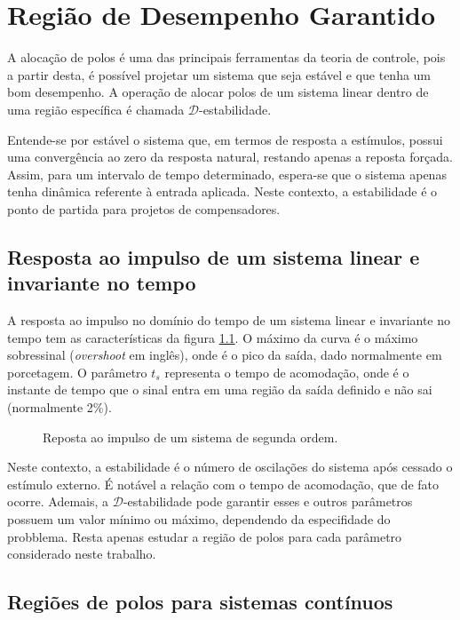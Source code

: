 \chapter{Região de Desempenho Garantido}

A alocação de polos é uma das principais ferramentas da teoria de controle, pois a partir desta, é possível projetar um sistema que seja estável e que tenha um bom desempenho\cite{ROSINOVA2014}. A operação de alocar polos de um sistema linear dentro de uma região específica é chamada $\mathscr{D}$-estabilidade\cite{CHILALI1996}.

Entende-se por estável o sistema que, em termos de resposta a estímulos, possui uma convergência ao zero da resposta natural, restando apenas a reposta forçada\cite{NISE2011}. Assim, para um intervalo de tempo determinado, espera-se que o sistema apenas tenha dinâmica referente à entrada aplicada. Neste contexto, a estabilidade é o ponto de partida para projetos de compensadores.

\section{Resposta ao impulso de um sistema linear e invariante no tempo}

A resposta ao impulso no domínio do tempo de um sistema linear e invariante no tempo tem as características da figura \ref{fig:ImpulseResponse}. O máximo da curva é o máximo sobressinal (\emph{overshoot} em inglês), onde é o pico da saída, dado normalmente em porcetagem. O parâmetro $t_s$ representa o tempo de acomodação, onde é o instante de tempo que o sinal entra em uma região da saída definido e não sai (normalmente 2\%).

\begin{figure}[!ht]
  \centering
  
  \caption{Reposta ao impulso de um sistema de segunda ordem.}
  \label{fig:ImpulseResponse}
\end{figure}

Neste contexto, a estabilidade é o número de oscilações do sistema após cessado o estímulo externo. É notável a relação com o tempo de acomodação, que de fato ocorre. Ademais, a $\mathscr{D}$-estabilidade pode garantir esses e outros parâmetros possuem um valor mínimo ou máximo, dependendo da especifidade do probblema. Resta apenas estudar a região de polos para cada parâmetro considerado neste trabalho.

\section{Regiões de polos para sistemas contínuos}\label{sec:DEstabilidadeS}

